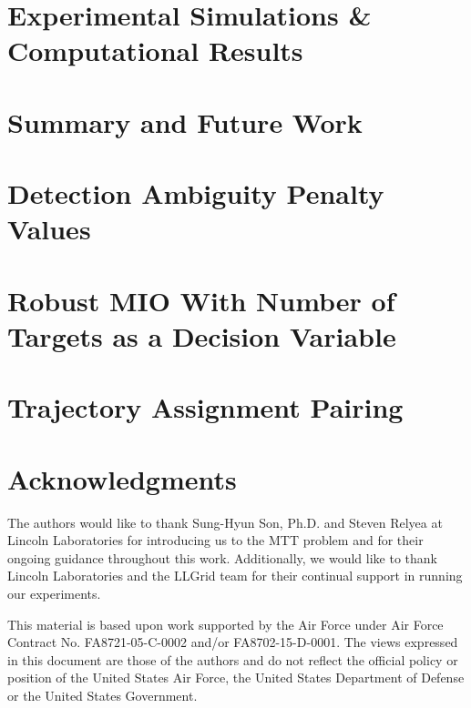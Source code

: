 \documentclass[journal]{IEEEtran}
\begin{document}
\section{Experimental Simulations \& Computational Results}\label{sec:Results}


\section{Summary and Future Work}\label{sec:Conclusion}


\appendices

\section{Detection Ambiguity Penalty Values}\label{app:Penalty_Appendix}


\section{Robust MIO With Number of Targets as a Decision Variable}\label{app:Robust_Appendix}


\section{Trajectory Assignment Pairing}\label{app:Assignment_Appendix}


\section*{Acknowledgments}
The authors would like to thank Sung-Hyun Son, Ph.D. and Steven Relyea at Lincoln Laboratories for introducing us to the MTT problem and for their ongoing guidance throughout this work. Additionally, we would like to thank Lincoln Laboratories and the LLGrid team for their continual support in running our experiments. 

This material is based upon work supported by the Air Force under Air Force Contract No. FA8721-05-C-0002 and/or FA8702-15-D-0001. The views expressed in this document are those of the authors and do not reflect the official policy or position of the United States Air Force, the United States Department of Defense or the United States Government.





\end{document}
